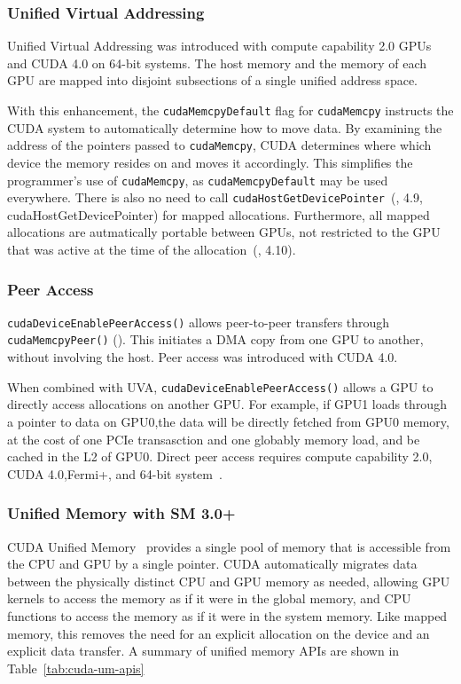 \subsubsection{Unified Virtual Addressing}

Unified Virtual Addressing was introduced with compute capability 2.0 GPUs  and CUDA 4.0 on 64-bit systems.
The host memory and the memory of each GPU are mapped into disjoint subsections of a single unified address space.

With this enhancement, the \texttt{cudaMemcpyDefault} flag for \texttt{cudaMemcpy} instructs the CUDA system to automatically determine how to move data.
By examining the address of the pointers passed to \texttt{cudaMemcpy}, CUDA determines where which device the memory resides on and moves it accordingly.
This simplifies the programmer's use of \texttt{cudaMemcpy}, as \texttt{cudaMemcpyDefault} may be used everywhere.
There is also no need to call \texttt{cudaHostGetDevicePointer}~(\cite{nvidia2018cuda}, 4.9, cudaHostGetDevicePointer) for mapped allocations.
Furthermore, all mapped allocations are autmatically portable between GPUs, not restricted to the GPU that was active at the time of the allocation~(\cite{nvidia2018cuda}, 4.10).

\subsubsection{Peer Access}

\texttt{cudaDeviceEnablePeerAccess()} allows peer-to-peer transfers through \texttt{cudaMemcpyPeer()} ().
This initiates a DMA copy from one GPU to another, without involving the host.
Peer access was introduced with CUDA 4.0.

When combined with UVA, \texttt{cudaDeviceEnablePeerAccess()} allows a GPU to directly access allocations on another GPU.
For example, if GPU1 loads through a pointer to data on GPU0,the data will be directly fetched from GPU0 memory, at the cost of one PCIe transasction and one globably memory load, and be cached in the L2 of GPU0.
Direct peer access requires compute capability 2.0, CUDA 4.0,Fermi+, and 64-bit system~\cite{schroeder2011peer}.

\subsubsection{Unified Memory with SM 3.0+}

CUDA Unified Memory~\cite{harris2013cudaunifiedmemory} provides a single pool of memory that is accessible from the CPU and GPU by a single pointer.
CUDA automatically migrates data between the physically distinct CPU and GPU memory as needed, allowing GPU kernels to access the memory as if it were in the global memory, and CPU functions to access the memory as if it were in the system memory.
Like mapped memory, this removes the need for an explicit allocation on the device and an explicit data transfer.
A summary of unified memory APIs are shown in Table~\ref{tab:cuda-um-apis}


